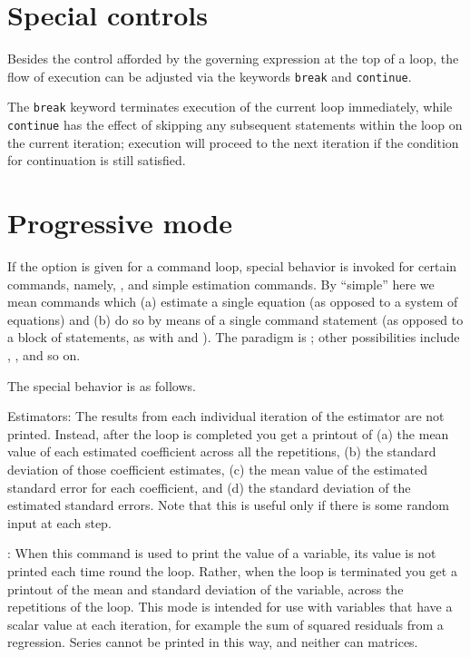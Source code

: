 \section{Special controls}
\label{loop-specials}

Besides the control afforded by the governing expression at the top of
a loop, the flow of execution can be adjusted via the keywords
\texttt{break} and \texttt{continue}.

The \texttt{break} keyword terminates execution of the current loop
immediately, while \texttt{continue} has the effect of skipping any
subsequent statements within the loop on the current iteration;
execution will proceed to the next iteration if the condition for
continuation is still satisfied.

\section{Progressive mode}
\label{loop-progressive}

If the  option is given for a command loop,
special behavior is invoked for certain commands, namely, ,
 and simple estimation commands.  By ``simple'' here we
mean commands which (a) estimate a single equation (as opposed to a
system of equations) and (b) do so by means of a single command
statement (as opposed to a block of statements, as with  and
).  The paradigm is ; other possibilities include
, ,  and so on.

The special behavior is as follows.

Estimators: The results from each individual iteration of the
estimator are not printed.  Instead, after the loop is completed you
get a printout of (a) the mean value of each estimated coefficient
across all the repetitions, (b) the standard deviation of those
coefficient estimates, (c) the mean value of the estimated standard
error for each coefficient, and (d) the standard deviation of the
estimated standard errors.  Note that this is useful only if there is
some random input at each step.

: When this command is used to print the value of a
variable, its value is not printed each time round the loop.  Rather,
when the loop is terminated you get a printout of the mean and
standard deviation of the variable, across the repetitions of the
loop.  This mode is intended for use with variables that have a scalar
value at each iteration, for example the sum of squared residuals from
a regression.  Series cannot be printed in this way, and neither can
matrices.

